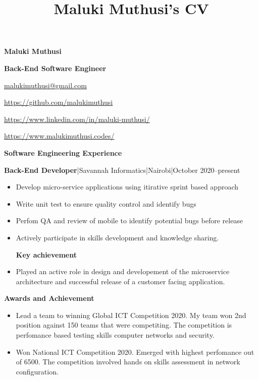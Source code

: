 \documentclass[a4paper]{article}
\begin{document}
\title{Maluki Muthusi's CV}

\begin{center}
    {\Large \textbf{Maluki Muthusi}} \par
    {\large \textbf{Back-End Software Engineer}}
\end{center}

\begin{description}[noitemsep]
    \item[\textbf{Email:}] \href{mailto:malukimuthusi@gmail.com}{malukimuthusi@gmail.com}
    \item[\textbf{Github:}] \url{https://github.com/malukimuthusi}
    \item[\textbf{LinkedIn:}]\url{https://www.linkedin.com/in/maluki-muthusi/}
    \item[\textbf{Website:}]\url{https://www.malukimuthusi.codes/}
\end{description}







\begin{center}
    {\Large \textbf{Software Engineering Experience}}
\end{center}
\textbf{Back-End Developer}|Savannah Informatics|Nairobi|October 2020--present
\begin{itemize}[noitemsep]
    \item Develop micro-service applications using itirative sprint based approach
    \item Write unit test to ensure quality control and identify bugs
    \item Perfom QA and review of mobile to identify potential bugs before release
    \item Actively participate in skills development and knowledge sharing.
          \begin{center}
              \textbf{Key achievement}
          \end{center}
    \item Played an active role in design and developement of the microservice architecture and successful release of a customer facing application.
\end{itemize}

\begin{center}
    {\Large \textbf{Awards and Achievement}}
\end{center}
\begin{itemize}[noitemsep]
    \item Lead a team to winning Global ICT Competition 2020. My team won 2nd position against 150 teams that were competiting. The competition is perfomance based testing skills computer networks and security.
    \item Won National ICT Competition 2020. Emerged with highest perfomance out of 6500. The competition involved hands on skills assessment in network configuration.
\end{itemize}
\end{document}
